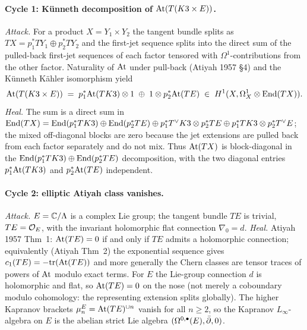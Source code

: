 \paragraph{Cycle 1: K\"unneth decomposition of $\mathrm{At}(T(K3 \times E))$.}
\emph{Attack.}
For a product $X = Y_1 \times Y_2$ the tangent bundle splits as
$TX = p_1^* TY_1 \oplus p_2^* TY_2$ and the first-jet sequence splits
into the direct sum of the pulled-back first-jet sequences of each
factor tensored with $\Omega^1$-contributions from the other factor.
Naturality of $\mathrm{At}$ under pull-back (Atiyah 1957 \S 4) and the
K\"unneth K\"ahler isomorphism yield
\[
  \mathrm{At}(T(K3 \times E)) \;=\; p_1^* \mathrm{At}(TK3) \otimes 1
  \;\oplus\; 1 \otimes p_2^* \mathrm{At}(TE)
  \;\in\; H^1(X, \Omega^1_X \otimes \mathrm{End}(TX)).
\]
\emph{Heal.}
The sum is a direct sum in $\mathrm{End}(TX) = \mathrm{End}(p_1^*TK3) \oplus
\mathrm{End}(p_2^*TE) \oplus p_1^* T^\vee K3 \otimes p_2^* TE \oplus
p_1^* TK3 \otimes p_2^* T^\vee E$; the mixed off-diagonal blocks are
zero because the jet extensions are pulled back from each factor
separately and do not mix. Thus $\mathrm{At}(TX)$ is block-diagonal in the
$\mathrm{End}(p_1^*TK3) \oplus \mathrm{End}(p_2^*TE)$ decomposition, with the two
diagonal entries $p_1^* \mathrm{At}(TK3)$ and $p_2^* \mathrm{At}(TE)$ independent.

\paragraph{Cycle 2: elliptic Atiyah class vanishes.}
\emph{Attack.}
$E = \mathbb{C}/\Lambda$ is a complex Lie group; the tangent bundle $TE$ is
trivial, $TE = \mathcal{O}_E$, with the invariant holomorphic flat connection
$\nabla_0 = d$.
\emph{Heal.}
Atiyah 1957 Thm~1: $\mathrm{At}(TE) = 0$ if and only if $TE$ admits a
holomorphic connection; equivalently (Atiyah Thm~2) the exponential
sequence gives $c_1(TE) = -\mathrm{tr}(\mathrm{At}(TE))$ and more generally
the Chern classes are tensor traces of powers of $\mathrm{At}$ modulo exact
terms. For $E$ the Lie-group connection $d$ is holomorphic and flat,
so $\mathrm{At}(TE) = 0$ on the nose (not merely a coboundary modulo
cohomology: the representing extension splits globally). The higher
Kapranov brackets $\mu_n^E = \mathrm{At}(TE)^{\cup n}$ vanish for all
$n \geq 2$, so the Kapranov $L_\infty$-algebra on $E$ is the abelian
strict Lie algebra $(\Omega^{0,\bullet}(E), \bar\partial, 0)$.

